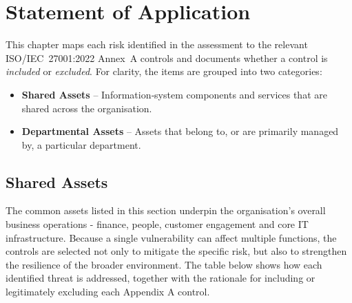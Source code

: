 \chapter{Statement of Application}
\label{chap:soa}

This chapter maps each risk identified in the assessment to the relevant ISO/IEC~27001:2022 Annex~A controls\cite{ismsonline2025annexa} and documents whether a control is \textit{included} or \textit{excluded}.  For clarity, the items are grouped into two categories:

\begin{itemize}
    \item \textbf{Shared Assets} – Information‑system components and services that are shared across the organisation.
    \item \textbf{Departmental Assets} – Assets that belong to, or are primarily managed by, a particular department.
\end{itemize}

\section{Shared Assets}

The common assets listed in this section underpin the organisation's overall business operations - finance, people,
customer engagement and core \ac{IT} infrastructure.  Because a single vulnerability can affect multiple functions,
the controls are selected not only to mitigate the specific risk, but also to strengthen the resilience of the
broader environment.  The table below shows how each identified threat is addressed, together with the rationale for
including or legitimately excluding each Appendix A control.

